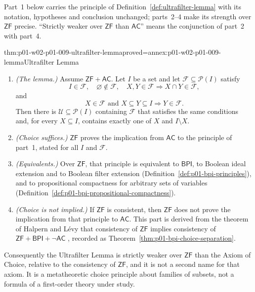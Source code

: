 Part~1 below carries the principle of Definition~\ref{def:ultrafilter-lemma}
with its notation, hypotheses and conclusion unchanged; parts~2--4 make its strength over \(\mathsf{ZF}\)
precise. ``Strictly weaker over \(\mathsf{ZF}\) than \(\mathsf{AC}\)'' means
the conjunction of part~2 with part~4.

\begin{hbtheorem}{thm:p01-w02-p01-009-ultrafilter-lemma}{proved=annex:p01-w02-p01-009-lemma}{Ultrafilter Lemma}
\begin{enumerate}
  \item \emph{(The lemma.)} Assume \(\mathsf{ZF}+\mathsf{AC}\). Let \(I\) be a
    set and let \(\mathcal F\subseteq\mathcal P(I)\) satisfy
    \[
      I\in\mathcal F,\quad\varnothing\notin\mathcal F,\quad
      X,Y\in\mathcal F\Rightarrow X\cap Y\in\mathcal F,
    \]
    and
    \[
      X\in\mathcal F\text{ and }X\subseteq Y\subseteq I
      \Rightarrow Y\in\mathcal F.
    \]
    Then there is \(\mathcal U\subseteq\mathcal P(I)\) containing
    \(\mathcal F\) that satisfies the same conditions and, for every
    \(X\subseteq I\), contains exactly one of \(X\) and \(I\setminus X\).
  \item \emph{(Choice suffices.)} \(\mathsf{ZF}\) proves the implication from
    \(\mathsf{AC}\) to the principle of part~1, stated for all \(I\) and
    \(\mathcal F\).
  \item \emph{(Equivalents.)} Over \(\mathsf{ZF}\), that principle is
    equivalent to \(\mathsf{BPI}\), to Boolean ideal extension and to Boolean
    filter extension (Definition~\ref{def:p01-bpi-principles}), and to
    propositional compactness for arbitrary sets of variables
    (Definition~\ref{def:p01-bpi-propositional-compactness}).
  \item \emph{(Choice is not implied.)} If \(\mathsf{ZF}\) is consistent, then
    \(\mathsf{ZF}\) does not prove the implication from that principle to
    \(\mathsf{AC}\). This part is derived from the theorem of Halpern and
    L\'evy that consistency of \(\mathsf{ZF}\) implies consistency of
    \(\mathsf{ZF}+\mathsf{BPI}+\neg\mathsf{AC}\) \cite{HalpernLevy1971},
    recorded as Theorem~\ref{thm:p01-bpi-choice-separation}.
\end{enumerate}
Consequently the Ultrafilter Lemma is strictly weaker over \(\mathsf{ZF}\)
than the Axiom of Choice, relative to the consistency of \(\mathsf{ZF}\), and
it is not a second name for that axiom. It is a metatheoretic choice
principle about families of subsets, not a formula of a first-order theory
under study.
\end{hbtheorem}

